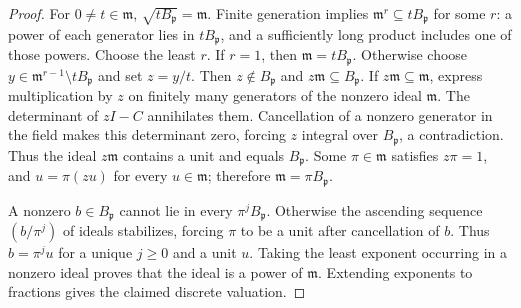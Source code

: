 \documentclass[11pt,a4paper]{article}
\theoremstyle{definition}\newtheorem{definition}[theorem]{Definition}
\begin{document}
\begin{proof}
For \(0\ne t\in\mathfrak m\),
\(\sqrt{tB_{\mathfrak p}}=\mathfrak m\). Finite generation implies
\(\mathfrak m^r\subseteq tB_{\mathfrak p}\) for some \(r\): a power
of each generator lies in \(tB_{\mathfrak p}\), and a sufficiently
long product includes one of those powers. Choose the least \(r\).
If \(r=1\), then \(\mathfrak m=tB_{\mathfrak p}\). Otherwise choose
\(y\in\mathfrak m^{r-1}\setminus tB_{\mathfrak p}\) and set \(z=y/t\).
Then \(z\notin B_{\mathfrak p}\) and \(z\mathfrak m\subseteq B_{\mathfrak p}\).
If \(z\mathfrak m\subseteq\mathfrak m\), express multiplication by
\(z\) on finitely many generators of the nonzero ideal \(\mathfrak m\).
The determinant of \(zI-C\) annihilates them. Cancellation of a
nonzero generator in the field makes this determinant zero, forcing
\(z\) integral over \(B_{\mathfrak p}\), a contradiction.
Thus the ideal \(z\mathfrak m\) contains a unit and equals
\(B_{\mathfrak p}\). Some \(\pi\in\mathfrak m\) satisfies \(z\pi=1\),
and \(u=\pi(zu)\) for every \(u\in\mathfrak m\); therefore
\(\mathfrak m=\pi B_{\mathfrak p}\).

A nonzero \(b\in B_{\mathfrak p}\) cannot lie in every
\(\pi^j B_{\mathfrak p}\). Otherwise the ascending sequence
\((b/\pi^j)\) of ideals stabilizes, forcing \(\pi\) to be a unit
after cancellation of \(b\). Thus \(b=\pi^j u\) for a unique
\(j\ge0\) and a unit \(u\). Taking the least exponent occurring in
a nonzero ideal proves that the ideal is a power of \(\mathfrak m\).
Extending exponents to fractions gives the claimed discrete valuation.
\end{proof}
\end{document}
